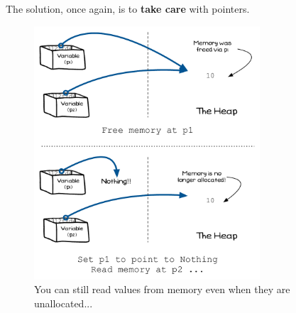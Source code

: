 The solution, once again, is to \textbf{take care} with pointers.

\begin{figure}[h]
   \centering
   \includegraphics[width=0.75\textwidth]{./topics/dynamic-memory/diagrams/ReadUnallocated} 
   \caption{You can still read values from memory even when they are unallocated...}
   \label{fig:read_unallocated}
\end{figure}






